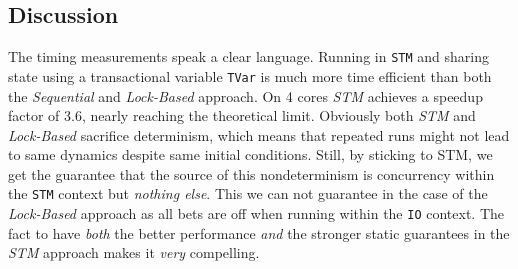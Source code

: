%

\subsection{Discussion}
The timing measurements speak a clear language. Running in \texttt{STM} and sharing state using a transactional variable \texttt{TVar} is much more time efficient than both the \textit{Sequential} and \textit{Lock-Based} approach. On 4 cores \textit{STM} achieves a speedup factor of 3.6, nearly reaching the theoretical limit.
Obviously both \textit{STM} and \textit{Lock-Based} sacrifice determinism, which means that repeated runs might not lead to same dynamics despite same initial conditions. Still, by sticking to STM, we get the guarantee that the source of this nondeterminism is concurrency within the \texttt{STM} context but \textit{nothing else}. This we can not guarantee in the case of the \textit{Lock-Based} approach as all bets are off when running within the \texttt{IO} context. The fact to have \textit{both} the better performance \textit{and} the stronger static guarantees in the \textit{STM} approach makes it \textit{very} compelling.